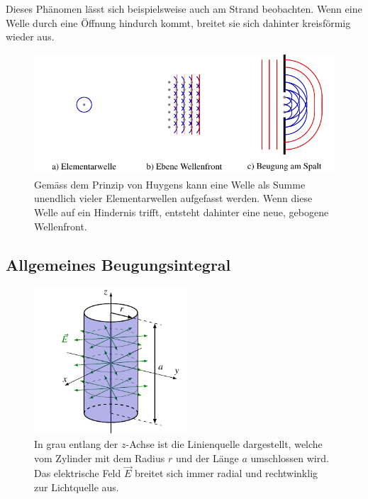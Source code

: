 Dieses Phänomen lässt sich beispielsweise auch am Strand beobachten. 
Wenn eine Welle durch eine Öffnung hindurch kommt, breitet sie sich dahinter kreisförmig wieder aus.

\begin{figure}
    \centering
    \includegraphics[width=120mm]{papers/opt/images/huygens.pdf}
    \caption{Gemäss dem Prinzip von Huygens kann eine Welle als Summe unendlich vieler Elementarwellen aufgefasst werden.
    Wenn diese Welle auf ein Hindernis trifft, entsteht dahinter eine neue, gebogene Wellenfront.}
    \label{opt:fig:huygens}
\end{figure}


\subsection{Allgemeines Beugungsintegral}

\begin{figure}
    \centering
    \includegraphics[width=57.34mm]{papers/opt/images/maxwell.pdf}
    \caption{In grau entlang der $z$-Achse ist die Linienquelle dargestellt, welche vom Zylinder mit dem Radius $r$ und der Länge $a$ umschlossen wird.
    Das elektrische Feld $\vec{E}$ breitet sich immer radial und rechtwinklig zur Lichtquelle aus.}
    \label{opt:fig:maxwell}
\end{figure}

